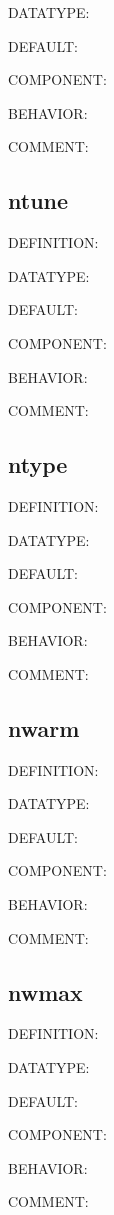 {\color{green}DATATYPE:}

{\color{blue}DEFAULT:}

{\color{brown}COMPONENT:}

{\color{purple}BEHAVIOR:}

{\color{olive}COMMENT:}

\subsection{ntune}
{\color{red}DEFINITION:}

{\color{green}DATATYPE:}

{\color{blue}DEFAULT:}

{\color{brown}COMPONENT:}

{\color{purple}BEHAVIOR:}

{\color{olive}COMMENT:}

\subsection{ntype}
{\color{red}DEFINITION:}

{\color{green}DATATYPE:}

{\color{blue}DEFAULT:}

{\color{brown}COMPONENT:}

{\color{purple}BEHAVIOR:}

{\color{olive}COMMENT:}

\subsection{nwarm}
{\color{red}DEFINITION:}

{\color{green}DATATYPE:}

{\color{blue}DEFAULT:}

{\color{brown}COMPONENT:}

{\color{purple}BEHAVIOR:}

{\color{olive}COMMENT:}

\subsection{nwmax}
{\color{red}DEFINITION:}

{\color{green}DATATYPE:}

{\color{blue}DEFAULT:}

{\color{brown}COMPONENT:}

{\color{purple}BEHAVIOR:}

{\color{olive}COMMENT:}

